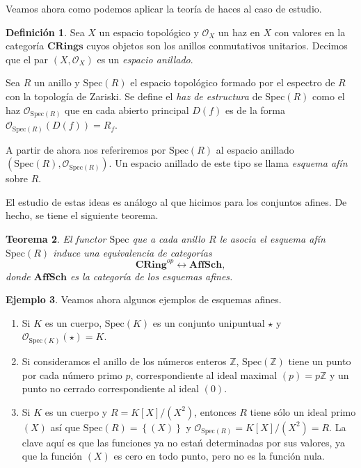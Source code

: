 \documentclass[12pt,a4paper]{article}
\newtheorem{thm}{Teorema}[section]
\theoremstyle{definition} \newtheorem{defn}[thm]{Definición}
\theoremstyle{definition} \newtheorem{ejemplo}[thm]{Ejemplo}
\theoremstyle{definition} \newtheorem{ejercicio}[thm]{Ejercicio}
\theoremstyle{remark} \newtheorem*{obs}{Observación}
\def\sp{\mathrm{Spec}}
\def\ZZ{\mathbb{Z}}
\def\OO{\mathscr{O}}
\begin{document}
	Veamos ahora como podemos aplicar la teoría de haces al caso de estudio.
	\begin{defn}
	  Sea $X$ un espacio topológico y $\OO_X$ un haz en $X$ con valores en la categoría $\mathbf{CRings}$ cuyos objetos son los anillos conmutativos unitarios. Decimos que el par $(X,\OO_X)$ es un \emph{espacio anillado}.

	  Sea $R$ un anillo y $\sp(R)$ el espacio topológico formado por el espectro de $R$ con la topología de Zariski. Se define el \emph{haz de estructura} de $\sp(R)$ como el haz $\OO_{\sp(R)}$ que en cada abierto principal $D(f)$ es de la forma $\OO_{\sp(R)}(D(f))=R_f$. 

	  A partir de ahora nos referiremos por $\sp(R)$ al espacio anillado $(\sp(R),\OO_{\sp(R)})$. Un espacio anillado de este tipo se llama \emph{esquema afín} sobre $R$.
	\end{defn}

	El estudio de estas ideas es análogo al que hicimos para los conjuntos afines. De hecho, se tiene el siguiente teorema.
	\begin{thm}
	  El functor $\sp$ que a cada anillo $R$ le asocia el esquema afín $\sp(R)$ induce una equivalencia de categorías
	  \begin{equation*}
	    \mathbf{CRing}^{op}\longleftrightarrow \mathbf{AffSch},
	  \end{equation*}
	  donde $\mathbf{AffSch}$ es la categoría de los esquemas afines.
	\end{thm}

	\begin{ejemplo}
	  Veamos ahora algunos ejemplos de esquemas afines.
\begin{enumerate}
  \item Si $K$ es un cuerpo, $\sp(K)$ es un conjunto unipuntual $\star$ y $\OO_{\sp(K)}(\star)=K$.
  \item Si consideramos el anillo de los números enteros $\ZZ$, $\sp(\ZZ)$ tiene un punto por cada número primo $p$, correspondiente al ideal maximal $(p)=p\ZZ$ y un punto no cerrado correspondiente al ideal $(0)$.
  \item Si $K$ es un cuerpo y $R=K[X]/(X^2)$, entonces $R$ tiene sólo un ideal primo $(X)$ así que $\sp(R)=\left\{ (X) \right\}$ y $\OO_{\sp(R)}=K[X]/(X^2)=R$. La clave aquí es que las funciones ya no estań determinadas por sus valores, ya que la función $(X)$ es cero en todo punto, pero no es la función nula.
\end{enumerate}
	\end{ejemplo}
\end{document}
